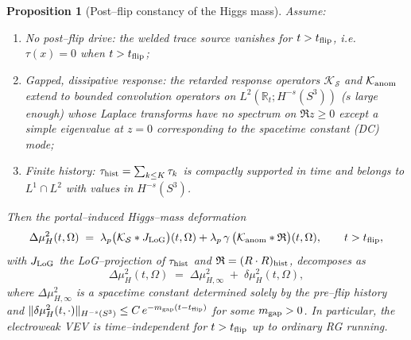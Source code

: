 \documentclass[10pt]{article}
\theoremstyle{definition}
\theoremstyle{plain}
\newtheorem{proposition}{Proposition}[section]
\begin{document}
\begin{proposition}[Post–flip constancy of the Higgs mass]\label{prop:const-Higgs-postflip}
Assume: 
\begin{enumerate}[label=(H\arabic*), leftmargin=2.1em, itemsep=2pt]
\item \emph{No post–flip drive:} the welded trace source vanishes for $t>t_{\rm flip}$, i.e.\ $\tau(x)=0$ when $t>t_{\rm flip}$;
\item \emph{Gapped, dissipative response:} the retarded response operators $\mathcal K_{\mathcal S}$ and $\mathcal K_{\rm anom}$ extend to bounded convolution operators on $L^2(\mathbb R_t;H^{-s}(S^3))$ ($s$ large enough) whose Laplace transforms have no spectrum on $\Re z\ge 0$ except a simple eigenvalue at $z=0$ corresponding to the spacetime constant (DC) mode;
\item \emph{Finite history:} $\tau_{\rm hist}=\sum_{k\le K}\tau_k$ is compactly supported in time and belongs to $L^1\cap L^2$ with values in $H^{-s}(S^3)$.
\end{enumerate}
Then the portal–induced Higgs–mass deformation 
\[
\Delta \mu_H^2(t,\Omega)\;=\;\lambda_p\big(\mathcal K_{\mathcal S} * J_{\rm LoG}\big)(t,\Omega)
+\lambda_p\,\gamma\,\big(\mathcal K_{\rm anom} * \mathfrak R\big)(t,\Omega),\qquad t>t_{\rm flip},
\]
with $J_{\rm LoG}$ the LoG–projection of $\tau_{\rm hist}$ and $\mathfrak R=(R\cdot R)_{\rm hist}$, decomposes as
\[
\Delta \mu_H^2(t,\Omega)\;=\;\Delta\mu_{H,\infty}^2\;+\;\delta\mu_H^2(t,\Omega),
\]
where $\Delta\mu_{H,\infty}^2$ is a spacetime constant determined solely by the pre–flip history and $\|\delta\mu_H^2(t,\cdot)\|_{H^{-s}(S^3)}\le C\,e^{-m_{\rm gap}(t-t_{\rm flip})}$ for some $m_{\rm gap}>0$. In particular, the electroweak VEV is time–independent for $t>t_{\rm flip}$ up to ordinary RG running.
\end{proposition}
\end{document}
